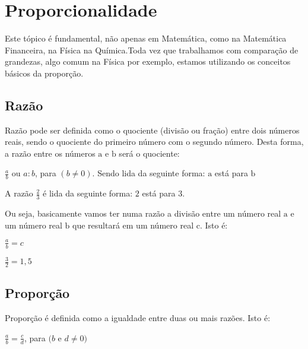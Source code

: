 \chapter{Proporcionalidade}
Este tópico é fundamental, não apenas em Matemática, como na Matemática Financeira, na Física  na Química.Toda vez que trabalhamos com comparação de grandezas, algo comum na Física por exemplo, estamos utilizando os conceitos básicos da proporção.   

\section{Razão}
\begin{definition}
    Razão pode ser definida como o quociente (divisão ou fração) entre dois números reais, sendo o quociente do primeiro número com o segundo número. Desta forma, a razão entre os números $\mathrm{a}$ e $\mathrm{b}$ será o quociente:
\end{definition}

	
	\begin{center}
		$\frac{a}{b}$ ou $a:b$, para $(b \neq 0)$. 	Sendo lida da seguinte forma: 
		$\mathrm{a}$ está para $\mathrm{b}$
	\end{center}


	\begin{example}
	A razão $\frac{2}{3}$ é lida da seguinte forma: $2$ está para $3$.
	\end{example}

Ou seja, basicamente vamos ter numa razão a divisão entre um número real $\mathrm{a}$ e um número real $\mathrm{b}$ que resultará em um número real $\mathrm{c}$. Isto é:  

	\begin{center}
		$\frac{a}{b} = c$ 
	\end{center}
	
	\begin{example}
	   $\frac{3}{2} = 1,5$
	\end{example}

\section{Proporção}

\begin{definition}
    Proporção é definida como a igualdade entre duas ou mais razões. Isto é:
\end{definition}


	\begin{center}
	    $\frac{a}{b} = \frac{c}{d}$, para $(b$ e $d \neq 0)$
	\end{center}

